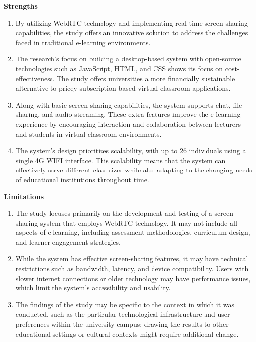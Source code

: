 \documentclass[a4paper,12pt]{article}  %
\begin{document}
\textbf{Strengths }\\
\begin{enumerate}
      \item By utilizing WebRTC technology and implementing real-time screen sharing
            capabilities, the study offers an innovative solution to address the challenges
            faced in traditional e-learning environments.\\
      \item The research's focus on building a desktop-based system with open-source
            technologies such as JavaScript, HTML, and CSS shows its focus on
            cost-effectiveness. The study offers universities a more financially
            sustainable alternative to pricey subscription-based virtual classroom
            applications.\\
      \item Along with basic screen-sharing capabilities, the system supports chat,
            file-sharing, and audio streaming. These extra features improve the e-learning
            experience by encouraging interaction and collaboration between lecturers and
            students in virtual classroom environments.\\
      \item The system's design prioritizes scalability, with up to 26 individuals using a
            single 4G WIFI interface. This scalability means that the system can
            effectively serve different class sizes while also adapting to the changing
            needs of educational institutions throughout time.\\
\end{enumerate}

\textbf{Limitations }\\
\begin{enumerate}
      \item The study focuses primarily on the development and testing of a screen-sharing
            system that employs WebRTC technology. It may not include all aspects of
            e-learning, including assessment methodologies, curriculum design, and learner
            engagement strategies.\\
      \item While the system has effective screen-sharing features, it may have technical
            restrictions such as bandwidth, latency, and device compatibility. Users with
            slower internet connections or older technology may have performance issues,
            which limit the system's accessibility and usability.\\
      \item The findings of the study may be specific to the context in which it was
            conducted, such as the particular technological infrastructure and user
            preferences within the university campus; drawing the results to other
            educational settings or cultural contexts might require additional change.\\
\end{enumerate}
\end{document}
